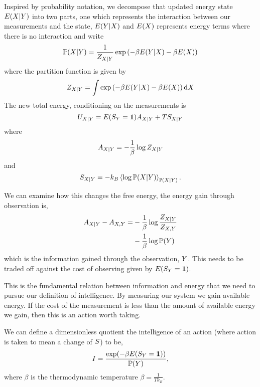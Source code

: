 \documentclass[]{article}
\begin{document}
Inspired by probability notation, we decompose that updated energy
state \(E(X| Y)\) into two parts, one which
represents the interaction between our measurements and the state,
\(E(Y|X)\) and \(E(X)\)
represents energy terms where there is no interaction and write 
\[
\mathbb{P}({X|Y}) = \frac{1}{Z_{X|Y}} \exp\left(-\beta E(Y|X) -\beta E(X)\right)
\] 
where the partition function is given by 
\[
Z_{X|Y} = \int \exp\left(-\beta E(Y|X) -\beta E(X)\right) \text{d}X
\] 
The new total energy, conditioning on the measurements is 
\[
U_{X|Y} = E(S_Y=\mathbf{1})  A_{X|Y} + TS_{X|Y}
\] 
where 
\[
A_{X|Y} = - \frac{1}{\beta}\log Z_{X|Y}
\] 
and 
\[
S_{X|Y} = -k_B \left\langle \log \mathbb{P}({X|Y}) \right\rangle_{\mathbb{P}({X|Y})}.
\]

We can examine how this changes the free energy, the energy gain through
observation is, 
\begin{align*}
A_{X|Y} - A_{X,Y} = & -\frac{1}{\beta} \log \frac{Z_{X|Y}}{Z_{X,Y}}\\
& -\frac{1}{\beta} \log \mathbb{P}(Y)
\end{align*}
which is the information gained through the observation, \(Y\). This needs to be traded off against the cost of observing given by $E(S_Y=\mathbf{1}) $.

This is the fundamental relation between information and energy that we need to pursue our definition of intelligence. By measuring our system we gain available energy. If the cost of the measurement is less than the amount of available energy we gain, then this is an action worth taking. 

We can define a dimensionless quotient the intelligence of an action (where action is taken to mean a change of $S$) to be,
\[
I = \frac{\exp(-\beta E(S_Y=\mathbf{1}))}{\mathbb{P}(Y)},\]
where $\beta$ is the thermodynamic temperature \(\beta = \frac{1}{Tk_B}\).
\end{document}
